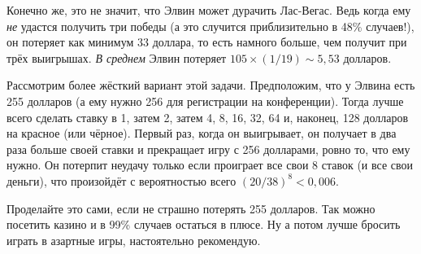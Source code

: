 Конечно же, это не значит, что Элвин может дурачить Лас-Вегас.
Ведь когда ему \emph{не} удастся получить три победы (а это случится приблизительно в 48\% случаев!), он потеряет как минимум 33 доллара, то есть намного больше, чем получит при трёх выигрышах.
\emph{В среднем} Элвин потеряет $105 \times (1/19) \sim 5{,}53$ долларов.

Рассмотрим более жёсткий вариант этой задачи.
Предположим, что у Элвина есть 255 долларов (а ему нужно 256 для регистрации на конференции).
Тогда лучше всего сделать ставку в 1, затем 2, затем 4, 8, 16, 32, 64 и, наконец, 128 долларов на красное (или чёрное).
Первый раз, когда он выигрывает, он получает в два раза больше своей ставки и прекращает игру с 256 долларами, ровно то, что ему нужно.
Он потерпит неудачу только если проиграет все свои $8$ ставок (и все свои деньги), что произойдёт с вероятностью всего $(20/38)^8 < 0{,}006$.

Проделайте это сами, если не страшно потерять 255 долларов.
Так можно посетить казино и в 99\% случаев остаться в плюсе.
Ну а потом лучше бросить играть в азартные игры, настоятельно рекомендую.
